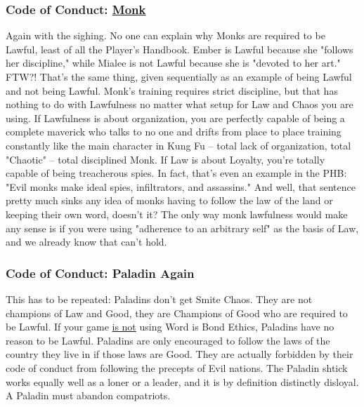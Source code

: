 \subsubsection{Code of Conduct: \hyperref[class:monk]{Monk}}
Again with the sighing. No one can explain why Monks are required to be Lawful, least of all the Player's Handbook. Ember is Lawful because she "follows her discipline," while Mialee is not Lawful because she is "devoted to her art." FTW?! That's the same thing, given sequentially as an example of being Lawful and not being Lawful. Monk's training requires strict discipline, but that has nothing to do with Lawfulness no matter what setup for Law and Chaos you are using. If Lawfulness is about organization, you are perfectly capable of being a complete maverick who talks to no one and drifts from place to place training constantly like the main character in Kung Fu -- total lack of organization, total "Chaotic" -- total disciplined Monk. If Law is about Loyalty, you're totally capable of being treacherous spies. In fact, that's even an example in the PHB: "Evil monks make ideal spies, infiltrators, and assassins." And well, that sentence pretty much sinks any idea of monks having to follow the law of the land or keeping their own word, doesn't it? The only way monk lawfulness would make any sense is if you were using "adherence to an arbitrary self" as the basis of Law, and we already know that can't hold.

\subsubsection{Code of Conduct: Paladin Again}
This has to be repeated: Paladins don't get Smite Chaos. They are not champions of Law and Good, they are Champions of Good who are required to be Lawful. If your game \underline{is not} using Word is Bond Ethics, Paladins have no reason to be Lawful. Paladins are only encouraged to follow the laws of the country they live in if those laws are Good. They are actually forbidden by their code of conduct from following the precepts of Evil nations. The Paladin shtick works equally well as a loner or a leader, and it is by definition distinctly disloyal. A Paladin must abandon compatriots.
